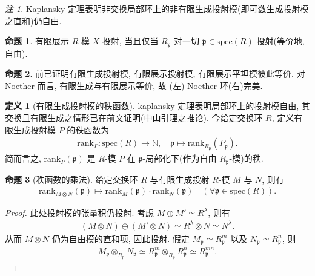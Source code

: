 \documentclass{MainStyle}
\theoremstyle{definition}
\theoremstyle{definition}
\theoremstyle{definition}
\newtheorem{definition}{定义}
\theoremstyle{definition}
\newtheorem{proposition}{命题}
\theoremstyle{definition}
\theoremstyle{definition}
\theoremstyle{definition}
\theoremstyle{remark}
\newtheorem{remark}{注}
\theoremstyle{remark}
\begin{document}
\begin{remark}
    Kaplansky 定理表明非交换局部环上的非有限生成投射模(即可数生成投射模之直和)仍自由.
\end{remark}

\begin{proposition}
    有限展示 $R$-模 $X$ 投射, 当且仅当 $R_{\mathfrak p}$ 对一切 $\mathfrak p\in \mathrm{spec}(R)$ 投射(等价地, 自由).
\end{proposition}

\begin{proposition}
    前已证明有限生成投射模, 有限展示投射模, 有限展示平坦模彼此等价. 对 Noether 而言, 有限生成与有限展示等价, 故 (左) Noether 环(右)完美.
\end{proposition}

\begin{definition}[有限生成投射模的秩函数]
    kaplansky 定理表明局部环上的投射模自由, 其交换且有限生成之情形已在前文证明(中山引理之推论). 今给定交换环 $R$, 定义有限生成投射模 $P$ 的秩函数为
    \begin{align*}
        \mathrm{rank}_P:\mathrm{spec}(R)\to \mathbb N,\quad \mathfrak p\mapsto \mathrm{rank}_{R_{\mathfrak p}}(P_{\mathfrak p}).
    \end{align*}
    简而言之, $\mathrm{rank}_P(\mathfrak p)$ 是 $R$-模 $P$ 在 $\mathfrak p$-局部化下(作为自由 $R_{\mathfrak p}$-模)的秩.
\end{definition}

\begin{proposition}[秩函数的乘法]
    给定交换环 $R$ 与有限生成投射 $R$-模 $M$ 与 $N$, 则有
    \begin{align*}
        \mathrm{rank}_{M\otimes N}(\mathfrak p)\mapsto \mathrm{rank}_M(\mathfrak p)\cdot \mathrm{rank}_N(\mathfrak p)\quad (\forall \mathfrak p\in \mathrm{spec}(R)).
    \end{align*}
    \begin{proof}
        此处投射模的张量积仍投射. 考虑 $M\oplus M'\simeq R^\lambda$, 则有
        \begin{align*}
            (M\otimes N)\oplus (M'\otimes N)\simeq R^\lambda\otimes N \simeq N^\lambda.
        \end{align*}
        从而 $M\otimes N$ 仍为自由模的直和项, 因此投射. 假定 $M_{\mathfrak p}\simeq R_{\mathfrak p}^m$ 以及 $N_{\mathfrak p}\simeq R_{\mathfrak p}^n$, 则
        \begin{align*}
            M_{\mathfrak p}\otimes_{R_{\mathfrak p}} N_{\mathfrak p}\simeq R_{\mathfrak p}^m\otimes_{R_{\mathfrak p}} R_{\mathfrak p}^n\simeq R_{\mathfrak p}^{mn}.
        \end{align*}
    \end{proof}
\end{proposition}
\end{document}
